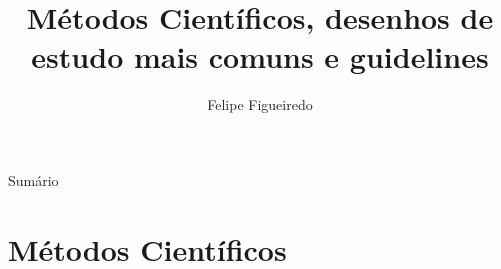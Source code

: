 \documentclass{beamer}
\title%
{Métodos Científicos, desenhos de estudo mais comuns e guidelines}
\subtitle
{} %
\author%
{Felipe Figueiredo}%
\institute[INTO] %
{Instituto Nacional de Traumatologia e Ortopedia
}
\date%
{}
\begin{document}
\begin{frame}
  \titlepage
\end{frame}

\begin{frame}{Sumário}
  \tableofcontents
\end{frame}








\section{Métodos Científicos}
\end{document}
